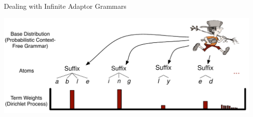 \documentclass[compress]{beamer}
\begin{document}
\begin{frame}{Dealing with Infinite Adaptor Grammars}
  \begin{center}
      \includegraphics[width=.9\linewidth]{onlineag/dp_johnny}

  \end{center}

\end{frame}
\end{document}
